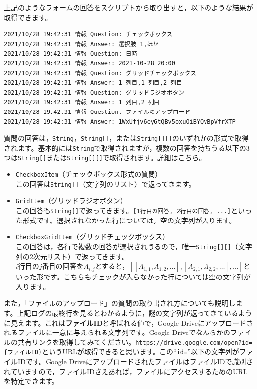 \documentclass[uplatex,a4j]{jsarticle}
\begin{document}
上記のようなフォームの回答をスクリプトから取り出すと，以下のような結果が取得できます。

\begin{lstlisting}[basicstyle=\ttfamily\footnotesize,frame=single,caption=Event Object sample 6]
2021/10/28 19:42:31	情報 Question: チェックボックス
2021/10/28 19:42:31	情報 Answer: 選択肢 1,ほか
2021/10/28 19:42:31	情報 Question: 日時
2021/10/28 19:42:31	情報 Answer: 2021-10-28 20:00
2021/10/28 19:42:31	情報 Question: グリッドチェックボックス
2021/10/28 19:42:31	情報 Answer: 1 列目,1 列目,2 列目
2021/10/28 19:42:31	情報 Question: グリッドラジオボタン
2021/10/28 19:42:31	情報 Answer: 1 列目,2 列目
2021/10/28 19:42:31	情報 Question: ファイルのアップロード
2021/10/28 19:42:31	情報 Answer: 1WxUfjv6ey6tQBv5oxuOiBYQvBpVfrXTP
\end{lstlisting}


質問の回答は，\verb|String|，\verb|String[]|，または\verb|String[][]|のいずれかの形式で取得されます。基本的には\verb|String|で取得されますが，複数の回答を持ちうる以下の3つは\verb|String[]|または\verb|String[][]|で取得されます。詳細は\href{https://developers.google.com/apps-script/reference/forms/item-response.html?hl=en#getResponse()}{こちら}。
\begin{itemize}
\item \verb|CheckboxItem|（チェックボックス形式の質問）\\
この回答は\verb|String[]|（文字列のリスト）で返ってきます。
\item \verb|GridItem|（グリッドラジオボタン）\\
この回答も\verb|String[]|で返ってきます。\verb|[1行目の回答, 2行目の回答, ...]|といった形式です。選択されなかった行については，空の文字列が入ります。
\item \verb|CheckboxGridItem|（グリッドチェックボックス）\\
この回答は，各行で複数の回答が選択されうるので，唯一\verb|String[][]|（文字列の2次元リスト）で返ってきます。\\
$i$行目の$j$番目の回答を$A_{i, j}$とすると，$\left[\left[A_{1, 1}, A_{1, 2}, \dots\right], \left[A_{2, 1}, A_{2,2}, \dots\right], \dots\right]$といった形です。こちらもチェックが入らなかった行については空の文字列が入ります。
\end{itemize}

また，「ファイルのアップロード」の質問の取り出され方についても説明します。上記ログの最終行を見るとわかるように，謎の文字列が返ってきているように見えます。これは\textbf{ファイルID}と呼ばれる値で，Google Driveにアップロードされるファイルに一意に与えられる文字列です。Google Driveでなんらかのファイルの共有リンクを取得してみてください。\verb|https://drive.google.com/open?id={ファイルID}|というURLが取得できると思います。この``\verb|id=|''以下の文字列がファイルIDです。Google DriveにアップロードされたファイルはファイルIDで識別されていますので，ファイルIDさえあれば，ファイルにアクセスするためのURLを特定できます。
\end{document}
